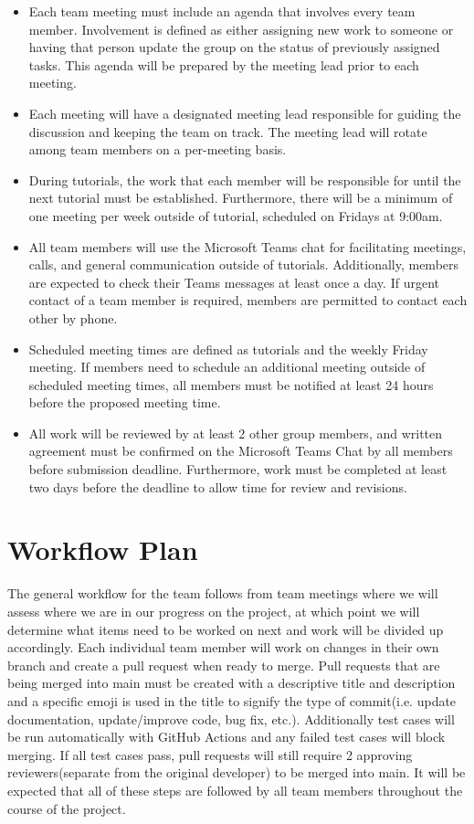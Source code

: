 \documentclass{article}
\begin{document}
\begin{itemize}
	\item Each team meeting must include an agenda that involves every team member. Involvement is defined as either assigning new work to someone or having that person update the group on the status of previously assigned tasks. This agenda will be prepared by the meeting lead prior to each meeting.
	\item Each meeting will have a designated meeting lead responsible for guiding the discussion and keeping the team on track. The meeting lead will rotate among team members on a per-meeting basis.
	\item During tutorials, the work that each member will be responsible for until the next tutorial must be established. Furthermore, there will be a minimum of one meeting per week outside of tutorial, scheduled on Fridays at 9:00am.
	\item All team members will use the Microsoft Teams chat for facilitating meetings, calls, and general communication outside of tutorials. Additionally, members are expected to check their Teams messages at least once a day. If urgent contact of a team member is required, members are permitted to contact each other by phone.
	\item Scheduled meeting times are defined as tutorials and the weekly Friday meeting. If members need to schedule an additional meeting outside of scheduled meeting times, all members must be notified at least 24 hours before the proposed meeting time.
	\item All work will be reviewed by at least 2 other group members, and written agreement must be confirmed on the Microsoft Teams Chat by all members before submission deadline. Furthermore, work must be completed at least two days before the deadline to allow time for review and revisions.
\end{itemize}


\section{Workflow Plan}

The general workflow for the team follows from team meetings where we will assess where we are in our progress on the project, at which point we will determine what items need to be worked on next and work will be divided up accordingly. Each individual team member will work on changes in their own branch and create a pull request when ready to merge. Pull requests that are being merged into main must be created with a descriptive title and description and a specific emoji is used in the title to signify the type of commit(i.e. update documentation, update/improve code, bug fix, etc.). Additionally test cases will be run automatically with GitHub Actions and any failed test cases will block merging. If all test cases pass, pull requests will still require 2 approving reviewers(separate from the original developer) to be merged into main. It will be expected that all of these steps are followed by all team members throughout the course of the project. \newline
\end{document}

